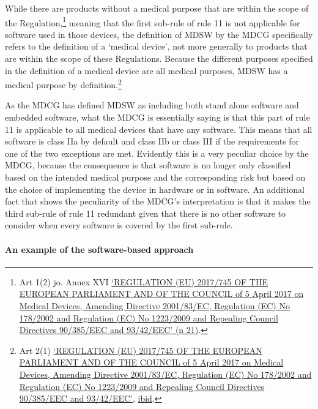 \documentclass[
]{scrartcl}
\begin{document}
While there are products without a medical purpose that are within the scope of the Regulation,\footnote{Art 1(2) jo. Annex XVI \protect\hyperlink{ref-REGULATIONEU2017a}{{`{REGULATION} ({EU}) 2017/745 {OF THE EUROPEAN PARLIAMENT AND OF THE COUNCIL} of 5 {April} 2017 on Medical Devices, Amending {Directive} 2001/83/{EC}, {Regulation} ({EC}) {No} 178/2002 and {Regulation} ({EC}) {No} 1223/2009 and Repealing {Council Directives} 90/385/{EEC} and 93/42/{EEC}'} (n 21)}.} meaning that the first sub-rule of rule 11 is not applicable for software used in those devices, the definition of MDSW by the MDCG specifically refers to the definition of a `medical device', not more generally to products that are within the scope of these Regulations. Because the different purposes specified in the definition of a medical device are all medical purposes, MDSW has a medical purpose by definition.\footnote{Art 2(1) \protect\hyperlink{ref-REGULATIONEU2017a}{{`{REGULATION} ({EU}) 2017/745 {OF THE EUROPEAN PARLIAMENT AND OF THE COUNCIL} of 5 {April} 2017 on Medical Devices, Amending {Directive} 2001/83/{EC}, {Regulation} ({EC}) {No} 178/2002 and {Regulation} ({EC}) {No} 1223/2009 and Repealing {Council Directives} 90/385/{EEC} and 93/42/{EEC}'}}, \protect\hyperlink{ref-REGULATIONEU2017a}{ibid}.}

As the MDCG has defined MDSW as including both stand alone software and embedded software, what the MDCG is essentially saying is that this part of rule 11 is applicable to all medical devices that have any software. This means that all software is class IIa by default and class IIb or class III if the requirements for one of the two exceptions are met. Evidently this is a very peculiar choice by the MDCG, because the consequence is that software is no longer only classified based on the intended medical purpose and the corresponding risk but based on the choice of implementing the device in hardware or in software. An additional fact that shows the peculiarity of the MDCG's interpretation is that it makes the third sub-rule of rule 11 redundant given that there is no other software to consider when every software is covered by the first sub-rule.

\hypertarget{an-example-of-the-software-based-approach}{%
\paragraph{An example of the software-based approach}\label{an-example-of-the-software-based-approach}}
\end{document}
